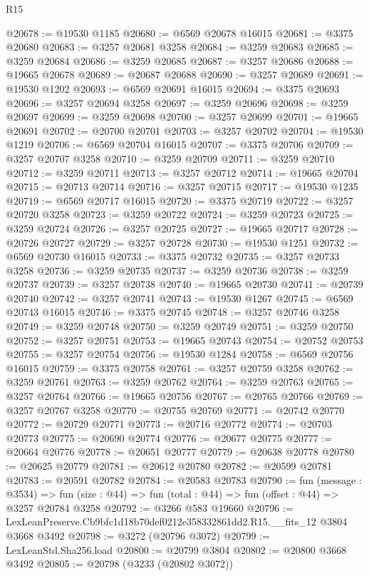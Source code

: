 \begin{lexlean}{R15}
\begin{coremodule}
@20678 := @19530 @1185
@20680 := @6569 @20678 @16015
@20681 := @3375 @20680
@20683 := @3257 @20681 @3258
@20684 := @3259 @20683
@20685 := @3259 @20684
@20686 := @3259 @20685
@20687 := @3257 @20686
@20688 := @19665 @20678
@20689 := @20687 @20688
@20690 := @3257 @20689
@20691 := @19530 @1202
@20693 := @6569 @20691 @16015
@20694 := @3375 @20693
@20696 := @3257 @20694 @3258
@20697 := @3259 @20696
@20698 := @3259 @20697
@20699 := @3259 @20698
@20700 := @3257 @20699
@20701 := @19665 @20691
@20702 := @20700 @20701
@20703 := @3257 @20702
@20704 := @19530 @1219
@20706 := @6569 @20704 @16015
@20707 := @3375 @20706
@20709 := @3257 @20707 @3258
@20710 := @3259 @20709
@20711 := @3259 @20710
@20712 := @3259 @20711
@20713 := @3257 @20712
@20714 := @19665 @20704
@20715 := @20713 @20714
@20716 := @3257 @20715
@20717 := @19530 @1235
@20719 := @6569 @20717 @16015
@20720 := @3375 @20719
@20722 := @3257 @20720 @3258
@20723 := @3259 @20722
@20724 := @3259 @20723
@20725 := @3259 @20724
@20726 := @3257 @20725
@20727 := @19665 @20717
@20728 := @20726 @20727
@20729 := @3257 @20728
@20730 := @19530 @1251
@20732 := @6569 @20730 @16015
@20733 := @3375 @20732
@20735 := @3257 @20733 @3258
@20736 := @3259 @20735
@20737 := @3259 @20736
@20738 := @3259 @20737
@20739 := @3257 @20738
@20740 := @19665 @20730
@20741 := @20739 @20740
@20742 := @3257 @20741
@20743 := @19530 @1267
@20745 := @6569 @20743 @16015
@20746 := @3375 @20745
@20748 := @3257 @20746 @3258
@20749 := @3259 @20748
@20750 := @3259 @20749
@20751 := @3259 @20750
@20752 := @3257 @20751
@20753 := @19665 @20743
@20754 := @20752 @20753
@20755 := @3257 @20754
@20756 := @19530 @1284
@20758 := @6569 @20756 @16015
@20759 := @3375 @20758
@20761 := @3257 @20759 @3258
@20762 := @3259 @20761
@20763 := @3259 @20762
@20764 := @3259 @20763
@20765 := @3257 @20764
@20766 := @19665 @20756
@20767 := @20765 @20766
@20769 := @3257 @20767 @3258
@20770 := @20755 @20769
@20771 := @20742 @20770
@20772 := @20729 @20771
@20773 := @20716 @20772
@20774 := @20703 @20773
@20775 := @20690 @20774
@20776 := @20677 @20775
@20777 := @20664 @20776
@20778 := @20651 @20777
@20779 := @20638 @20778
@20780 := @20625 @20779
@20781 := @20612 @20780
@20782 := @20599 @20781
@20783 := @20591 @20782
@20784 := @20583 @20783
@20790 := fun (message : @3534) =>
  fun (size : @44) => fun (total : @44) => fun (offset : @44) => @3257 @20784 @3258
@20792 := @3266 @583 @19660
@20796 := LexLeanPreserve.Cb9bfc1d18b70def0212e358332861dd2.R15.__fits_12 @3804 @3668 @3492
@20798 := @3272 (@20796 @3072)
@20799 := LexLeanStd.Sha256.load
@20800 := @20799 @3804
@20802 := @20800 @3668 @3492
@20805 := @20798 (@3233 (@20802 @3072))

\end{coremodule}
\end{lexlean}
